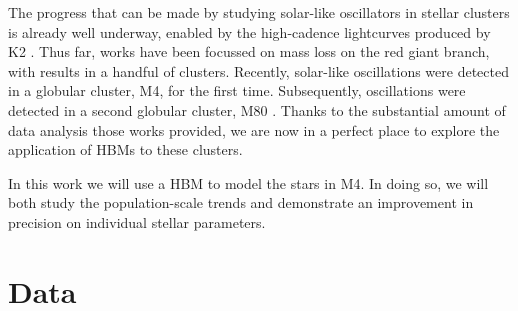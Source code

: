 \documentclass[fleqn,usenatbib]{mnras}
\begin{document}
The progress that can be made by studying solar-like oscillators in stellar clusters is already well underway, enabled by the high-cadence lightcurves produced by K2 \citep{2011ApJ...729L..10B, 2011ApJ...739...13S, 2012MNRAS.419.2077M, 2012ApJ...757..190C, 2017MNRAS.472..979H, 2021MNRAS.507..496B, 2023A&A...679A..23B}. Thus far, works have been focussed on mass loss on the red giant branch, with results in a handful of clusters. Recently, solar-like oscillations were detected in a globular cluster, M4, for the first time. Subsequently, oscillations were detected in a second globular cluster, M80 \citep{2024MNRAS.527.7974H}. Thanks to the substantial amount of data analysis those works provided, we are now in a perfect place to explore the application of HBMs to these clusters. 


In this work we will use a HBM to model the stars in M4. In doing so, we will both study the population-scale trends and demonstrate an improvement in precision on individual stellar parameters.

\section{Data}
\end{document}

